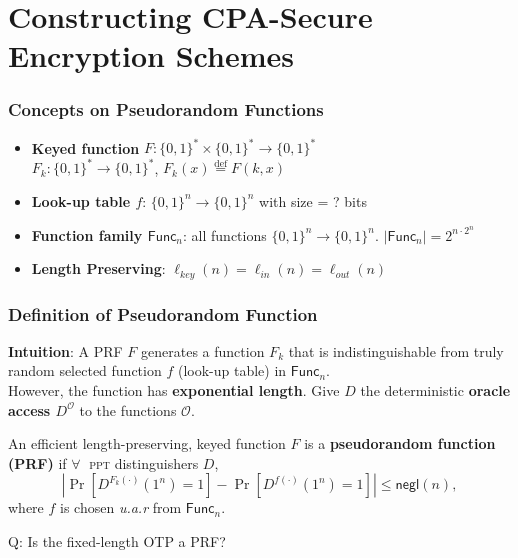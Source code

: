 \section{Constructing CPA-Secure Encryption Schemes}
\begin{frame}\frametitle{Concepts on Pseudorandom Functions}
\begin{figure}
\begin{center}

\end{center}
\end{figure}
\begin{itemize}
\item \textbf{Keyed function} $F : \{0,1\}^* \times \{0,1\}^* \to \{0,1\}^*$ \\
$F_k : \{0,1\}^* \to \{0,1\}^*$, $F_k(x) \overset{\text{def}}{=} F(k,x)$
\item \textbf{Look-up table $f$}: $\{0,1\}^n \to \{0,1\}^n$ with size \alert{ = ? bits} %
\item \textbf{Function family $\mathsf{Func}_n$}: all functions $\{0,1\}^n \to \{0,1\}^n$. $|\mathsf{Func}_n| = 2^{n\cdot2^n}$
\item \textbf{Length Preserving}: $\ell_{key}(n) = \ell_{in}(n) = \ell_{out}(n)$
\end{itemize}
\end{frame}
\begin{frame}\frametitle{Definition of Pseudorandom Function}
\textbf{Intuition}: A PRF $F$ generates a function $F_k$ that is indistinguishable from truly random selected function $f$ (look-up table) in $\mathsf{Func}_n$.\\ However, the function has \textbf{exponential length}. Give $D$ the deterministic \textbf{oracle access $D^{\mathcal{O}}$} to the functions $\mathcal{O}$.
\begin{definition}
An efficient length-preserving, keyed function $F$ is a \textbf{pseudorandom function (PRF)} if
$\forall\;$ \textsc{ppt} distinguishers $D$,
\[ \left|\Pr[D^{F_k(\cdot)}(1^n)=1] - \Pr[D^{f(\cdot)}(1^n)=1]\right| \le \mathsf{negl}(n),
\]
where $f$ is chosen \emph{u.a.r} from $\mathsf{Func}_n$.
\end{definition}
\begin{alertblock}{Q: Is the fixed-length OTP a PRF?}
\end{alertblock}
\end{frame}

